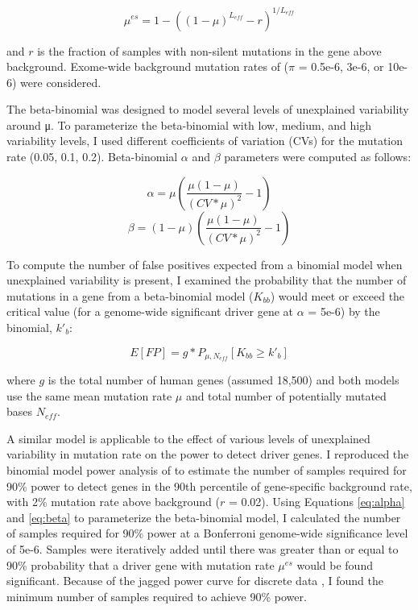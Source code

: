 \begin{equation}
\mu^{es} = 1 - ((1-\mu)^{L_{eff}}-r)^{1/L_{eff}}
\end{equation}

and $r$ is the fraction of samples with non-silent mutations in the gene above background. Exome-wide background mutation rates of ($\pi$ = 0.5e-6, 3e-6, or 10e-6) were considered.

The beta-binomial was designed to model several levels of unexplained variability around μ. To parameterize the beta-binomial with low, medium, and high variability levels, I used different coefficients of variation (CVs) for the mutation rate (0.05, 0.1, 0.2). Beta-binomial $\alpha$ and $\beta$ parameters were computed as follows:

\begin{equation}
\label{eq:alpha}
\alpha = \mu\left(\frac{\mu(1-\mu)}{(CV*\mu)^2}-1\right)
\end{equation}
\begin{equation}
\label{eq:beta}
\beta = (1-\mu)\left(\frac{\mu(1-\mu)}{(CV*\mu)^2}-1\right)
\end{equation}

To compute the number of false positives expected from a binomial model when unexplained variability is present, I examined the probability that the number of mutations in a gene from a beta-binomial model ($K_{bb}$) would meet or exceed the critical value (for a genome-wide significant driver gene at $\alpha$ = 5e-6) by the binomial, $k'_b$:

\begin{equation}
E[FP] = g*P_{\mu,N_{eff}}[K_{bb}\geq k'_b]
\end{equation}

where $g$ is the total number of human genes (assumed 18,500) and both models use the same mean mutation rate $\mu$ and total number of potentially mutated bases $N_{eff}$.

A similar model is applicable to the effect of various levels of unexplained variability in mutation rate on the power to detect driver genes. I reproduced the binomial model power analysis of \cite{RN14} to estimate the number of samples required for 90\% power to detect genes in the 90th percentile of gene-specific background rate, with 2\% mutation rate above background ($r$ = 0.02). Using Equations \ref{eq:alpha} and \ref{eq:beta} to parameterize the beta-binomial model, I calculated the number of samples required for 90\% power at a Bonferroni genome-wide significance level of 5e-6. Samples were iteratively added until there was greater than or equal to 90\% probability that a driver gene with mutation rate $\mu^{es}$ would be found significant. Because of the jagged power curve for discrete data \cite{RN75}, I found the minimum number of samples required to achieve 90\% power.

